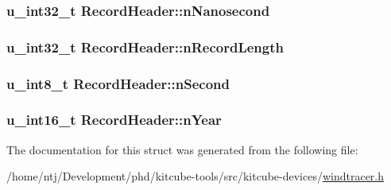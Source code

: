 \hypertarget{structRecordHeader_a0c741452a2f775a312239ed78bf2b1af}{
\subsubsection[{n\-Nanosecond}]{\setlength{\rightskip}{0pt plus 5cm}u\-\_\-int32\-\_\-t Record\-Header\-::n\-Nanosecond}}\label{structRecordHeader_a0c741452a2f775a312239ed78bf2b1af}
\hypertarget{structRecordHeader_ab2c22b9c223c2192b276e9b974a6640c}{
\subsubsection[{n\-Record\-Length}]{\setlength{\rightskip}{0pt plus 5cm}u\-\_\-int32\-\_\-t Record\-Header\-::n\-Record\-Length}}\label{structRecordHeader_ab2c22b9c223c2192b276e9b974a6640c}
\hypertarget{structRecordHeader_a5c5f81841da5dcb626f100c066ae6b13}{
\subsubsection[{n\-Second}]{\setlength{\rightskip}{0pt plus 5cm}u\-\_\-int8\-\_\-t Record\-Header\-::n\-Second}}\label{structRecordHeader_a5c5f81841da5dcb626f100c066ae6b13}
\hypertarget{structRecordHeader_a3064cb361ad0ee08e205e6734ef92a54}{
\subsubsection[{n\-Year}]{\setlength{\rightskip}{0pt plus 5cm}u\-\_\-int16\-\_\-t Record\-Header\-::n\-Year}}\label{structRecordHeader_a3064cb361ad0ee08e205e6734ef92a54}


The documentation for this struct was generated from the following file\-:\begin{DoxyCompactItemize}
\item 
/home/ntj/\-Development/phd/kitcube-\/tools/src/kitcube-\/devices/\hyperlink{windtracer_8h}{windtracer.\-h}\end{DoxyCompactItemize}

